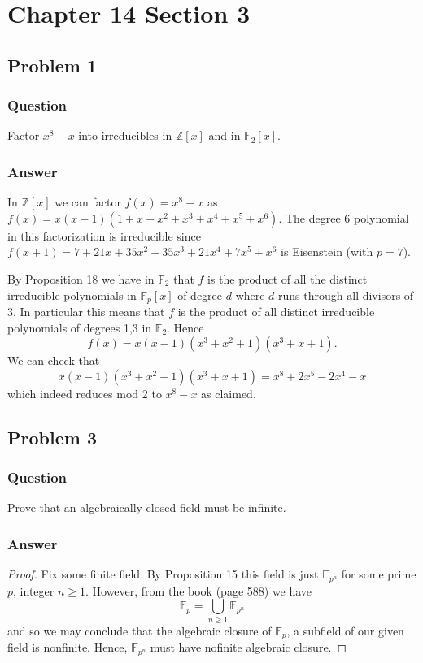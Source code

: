 \documentclass[10pt]{article}
\begin{document}
\section{Chapter 14 Section 3}
\subsection{Problem 1}
\subsubsection{Question}
Factor $x^8-x$ into irreducibles in $\mathbb{Z}[x]$ and in $\mathbb{F}_2[x]$.
\subsubsection{Answer}
In $\mathbb{Z}[x]$ we can factor $f(x)=x^8-x$ as $ f(x)=x (x-1)\left(1+x+x^2+x^3+x^4+x^5 + x^6\right)$. The degree $6$ polynomial in this factorization is irreducible since $f(x+1)= 7+21 x+35 x^2+35 x^3+21 x^4+7 x^5+x^6$ is Eisenstein (with $p=7$).

By Proposition 18 we have in $\mathbb{F}_2$ that $f$ is the product of all the distinct irreducible polynomials in $\mathbb{F}_p[x]$ of degree $d$ where $d$ runs through all divisors of $3$. In particular this means that $f$ is the product of all distinct irreducible polynomials of degrees 1,3 in $\mathbb{F}_2$. Hence
\[f(x) = x(x-1)(x^3+x^2+1)(x^3+x+1) .\]
We can check that
\[ x(x-1)(x^3+x^2+1)(x^3+x+1) = x^8+2x^5-2x^4-x\]
which indeed reduces mod 2 to $x^8-x$ as claimed.


\subsection{Problem 3}
\subsubsection{Question}
Prove that an algebraically closed field must be infinite.
\subsubsection{Answer}
\begin{proof}
Fix some finite field. By Proposition 15 this field is just $\mathbb{F}_{p^n}$ for some prime $p$, integer $n \geq 1$. However, from the book (page 588) we have
\[\overline{\mathbb{F}_p} = \bigcup_{n \geq1} \mathbb{F}_{p^n}\]
and so we may conclude that the algebraic closure of $\mathbb{F}_p$, a subfield of our given field is nonfinite. Hence, $\mathbb{F}_{p^n}$ must have nofinite algebraic closure.
\end{proof}
\end{document}
